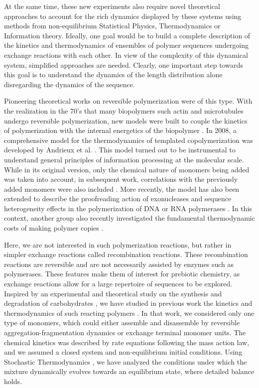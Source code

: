\documentclass[
	amsmath,
	amssymb,
	a4paper,
	aip,		%
	jcp,		%
	reprint, twocolumn  %
	fleqn,
	showpacs,
	floatfix
]{revtex4-1}
\begin{document}
At the same time, these new experiments also require novel theoretical approaches to account for the rich dynamics 
displayed by these systems using methods from non-equilibrium Statistical Physics, Thermodynamics or Information theory.   
Ideally, one goal would be to build a complete description of the kinetics and thermodynamics of ensembles of polymer sequences 
undergoing exchange reactions with each other.
In view of the complexity of this dynamical system, simplified approaches are needed. Clearly, one  
important step towards this goal is to understand the dynamics of the length distribution alone disregarding 
the dynamics of the sequence. 

Pioneering theoretical works on reversible polymerization \cite{Flory1944,Blatz1945} were of this type. 
With the realization in the 70's that many biopolymers such actin and microtubules undergo reversible polymerization,
new models were built to couple the kinetics of polymerization with the internal energetics of 
the biopolymer \cite{Hill1989,Oosawa}. In 2008, a comprehensive model for the thermodynamics
of templated copolymerization was developed by Andrieux et al. \cite{Andrieux2008_vol105}.  
This model turned out to be instrumental to understand general principles of information processing at the molecular scale. 
While in its original version, only the chemical nature of monomers being added was taken into account, in subsequent work, 
correlations with the previously added monomers were also included \cite{Gaspard2014}. More recently, the model has also been extended 
to describe the proofreading action of exonucleases \cite{Gaspard2016b} and sequence heterogeneity effects in the polymerization of DNA or RNA 
polymerases \cite{Gaspard2016}. In this context, another group also recently investigated the fundamental thermodynamic costs of making 
polymer copies \cite{Ouldridge2017}.

Here, we are not interested in such polymerization reactions, but rather in simpler exchange reactions called recombination reactions. 
These recombination reactions are reversible and are not necessarily assisted by enzymes such as polymerases. 
These features make them of interest for prebiotic chemistry, as exchange reactions allow for a large repertoire of sequences to be explored. 
Inspired by an experimental and theoretical study on the synthesis and degradation of carbohydrates \cite{Kartal2011},
we have studied in previous work the kinetics and thermodynamics of such reacting polymers \cite{Lahiri2015}.
In that work, we considered only one type of monomers, which could either assemble and disassemble by reversible aggregation-fragmentation dynamics or exchange terminal monomer units.
The chemical kinetics was described by rate equations following the mass action law, 
and we assumed a closed system and non-equilibrium initial conditions. Using 
Stochastic Thermodynamics \cite{Seifert2012,Decker2015,Esposito201,Rao2016}, we have analyzed the conditions under which   
the mixture dynamically evolves towards an equilibrium state, where detailed balance holds. 
\end{document}
